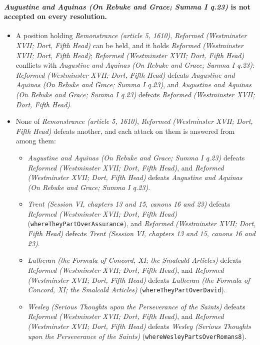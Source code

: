 \documentclass[11pt]{article}
\begin{document}
\paragraph{\emph{Augustine and Aquinas (On Rebuke and Grace; Summa I q.23)} is not accepted on every resolution.}
\begin{itemize}
\item A position holding \emph{Remonstrance (article 5, 1610)}, \emph{Reformed (Westminster XVII; Dort, Fifth Head)} can be held, and it holds \emph{Reformed (Westminster XVII; Dort, Fifth Head)}; \emph{Reformed (Westminster XVII; Dort, Fifth Head)} conflicts with \emph{Augustine and Aquinas (On Rebuke and Grace; Summa I q.23)}: \emph{Reformed (Westminster XVII; Dort, Fifth Head)} defeats \emph{Augustine and Aquinas (On Rebuke and Grace; Summa I q.23)}, and \emph{Augustine and Aquinas (On Rebuke and Grace; Summa I q.23)} defeats \emph{Reformed (Westminster XVII; Dort, Fifth Head)}.
\item None of \emph{Remonstrance (article 5, 1610)}, \emph{Reformed (Westminster XVII; Dort, Fifth Head)} defeats another, and each attack on them is answered from among them:
\begin{itemize}
\item \emph{Augustine and Aquinas (On Rebuke and Grace; Summa I q.23)} defeats \emph{Reformed (Westminster XVII; Dort, Fifth Head)}, and \emph{Reformed (Westminster XVII; Dort, Fifth Head)} defeats \emph{Augustine and Aquinas (On Rebuke and Grace; Summa I q.23)}.
\item \emph{Trent (Session VI, chapters 13 and 15, canons 16 and 23)} defeats \emph{Reformed (Westminster XVII; Dort, Fifth Head)} (\texttt{where\allowbreak{}They\allowbreak{}Part\allowbreak{}Over\allowbreak{}Assurance}), and \emph{Reformed (Westminster XVII; Dort, Fifth Head)} defeats \emph{Trent (Session VI, chapters 13 and 15, canons 16 and 23)}.
\item \emph{Lutheran (the Formula of Concord, XI; the Smalcald Articles)} defeats \emph{Reformed (Westminster XVII; Dort, Fifth Head)}, and \emph{Reformed (Westminster XVII; Dort, Fifth Head)} defeats \emph{Lutheran (the Formula of Concord, XI; the Smalcald Articles)} (\texttt{where\allowbreak{}They\allowbreak{}Part\allowbreak{}Over\allowbreak{}David}).
\item \emph{Wesley (Serious Thoughts upon the Perseverance of the Saints)} defeats \emph{Reformed (Westminster XVII; Dort, Fifth Head)}, and \emph{Reformed (Westminster XVII; Dort, Fifth Head)} defeats \emph{Wesley (Serious Thoughts upon the Perseverance of the Saints)} (\texttt{where\allowbreak{}Wesley\allowbreak{}Parts\allowbreak{}Over\allowbreak{}Romans8}).
\end{itemize}
\end{itemize}
\end{document}
